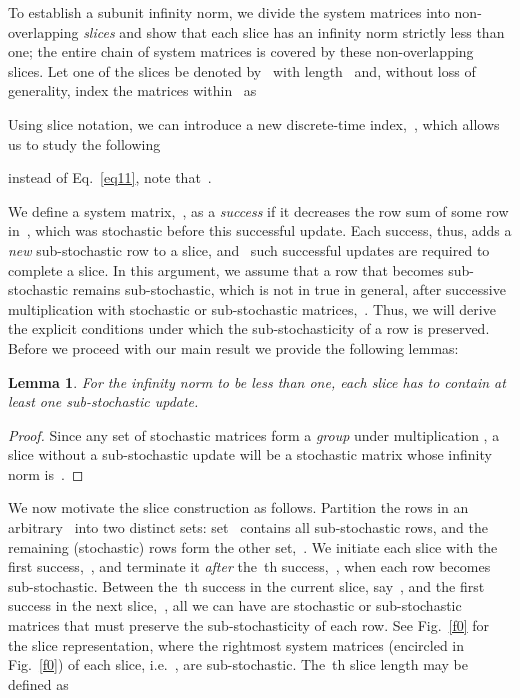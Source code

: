 \documentclass[draftclsnofoot, onecolumn, 12pt]{IEEEtran}
\newtheorem{lem}{Lemma}
\begin{document}
To establish a subunit infinity norm, we divide the system matrices into non-overlapping \textit{slices} and show that each slice has an infinity norm strictly less than one; the entire chain of system matrices is covered by these non-overlapping slices. Let one of the slices be denoted by~ with length~ and, without loss of generality, index the matrices within~ as


\noindent Using slice notation, we can introduce a new discrete-time index,~, which allows us to study the following

instead of Eq.~\eqref{eq11}, note that~. 

We define a system matrix,~, as a \textit{success} if it decreases the row sum of some row in~, which was stochastic before this successful update. Each success, thus, adds a \emph{new} sub-stochastic row to a slice, and~ such successful updates are required to complete a slice. In this argument, we assume that a row that becomes sub-stochastic remains sub-stochastic, which is not in true in general, after successive multiplication with stochastic or sub-stochastic matrices,~. Thus, we will derive the explicit conditions under which the sub-stochasticity of a row is preserved. Before we proceed with our main result we provide the following lemmas:

\begin{lem}\label{lem1}
For the infinity norm to be less than one, each slice has to contain at least one sub-stochastic update.
\end{lem}
\begin{proof}
Since any set of stochastic matrices form a \textit{group} under multiplication \cite{anton2010elementary}, a slice without a sub-stochastic update will be a stochastic matrix whose infinity norm is~.
\end{proof}

We now motivate the slice construction as follows. Partition the rows in an arbitrary~ into two distinct sets: set~ contains all sub-stochastic rows, and the remaining (stochastic) rows form the other set,~. We initiate each slice with the first success,~, and terminate it \textit{after} the~th success,~, when each row becomes sub-stochastic. Between the~th success in the current slice, say~, and the first success in the next slice,~, all we can have are stochastic or sub-stochastic matrices that must preserve the sub-stochasticity of each row. See Fig.~\ref{f0} for the slice representation, where the rightmost system matrices (encircled in Fig.~\ref{f0}) of each slice, i.e.~, are sub-stochastic. The~th slice length may be defined as
\end{document}
